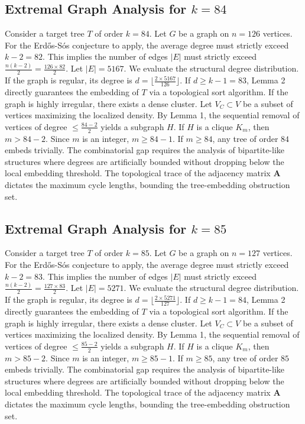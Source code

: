 \documentclass[11pt,a4paper]{article}
\begin{document}
\subsection{Extremal Graph Analysis for $k=84$}
Consider a target tree $T$ of order $k=84$.
Let $G$ be a graph on $n=126$ vertices.
For the Erd\H{o}s-S\'os conjecture to apply, the average degree must strictly exceed $k-2 = 82$.
This implies the number of edges $|E|$ must strictly exceed $\frac{n(k-2)}{2} = \frac{126 \times 82}{2}$.
Let $|E| = 5167$.
We evaluate the structural degree distribution. If the graph is regular, its degree is $d = \lfloor \frac{2 \times 5167}{126} \rfloor$.
If $d \geq k-1 = 83$, Lemma 2 directly guarantees the embedding of $T$ via a topological sort algorithm.
If the graph is highly irregular, there exists a dense cluster. Let $V_C \subset V$ be a subset of vertices maximizing the localized density.
By Lemma 1, the sequential removal of vertices of degree $\leq \frac{84-2}{2}$ yields a subgraph $H$.
If $H$ is a clique $K_{m}$, then $m > 84-2$. Since $m$ is an integer, $m \geq 84-1$. If $m \geq 84$, any tree of order $84$ embeds trivially.
The combinatorial gap requires the analysis of bipartite-like structures where degrees are artificially bounded without dropping below the local embedding threshold. The topological trace of the adjacency matrix $\mathbf{A}$ dictates the maximum cycle lengths, bounding the tree-embedding obstruction set.


\subsection{Extremal Graph Analysis for $k=85$}
Consider a target tree $T$ of order $k=85$.
Let $G$ be a graph on $n=127$ vertices.
For the Erd\H{o}s-S\'os conjecture to apply, the average degree must strictly exceed $k-2 = 83$.
This implies the number of edges $|E|$ must strictly exceed $\frac{n(k-2)}{2} = \frac{127 \times 83}{2}$.
Let $|E| = 5271$.
We evaluate the structural degree distribution. If the graph is regular, its degree is $d = \lfloor \frac{2 \times 5271}{127} \rfloor$.
If $d \geq k-1 = 84$, Lemma 2 directly guarantees the embedding of $T$ via a topological sort algorithm.
If the graph is highly irregular, there exists a dense cluster. Let $V_C \subset V$ be a subset of vertices maximizing the localized density.
By Lemma 1, the sequential removal of vertices of degree $\leq \frac{85-2}{2}$ yields a subgraph $H$.
If $H$ is a clique $K_{m}$, then $m > 85-2$. Since $m$ is an integer, $m \geq 85-1$. If $m \geq 85$, any tree of order $85$ embeds trivially.
The combinatorial gap requires the analysis of bipartite-like structures where degrees are artificially bounded without dropping below the local embedding threshold. The topological trace of the adjacency matrix $\mathbf{A}$ dictates the maximum cycle lengths, bounding the tree-embedding obstruction set.
\end{document}

